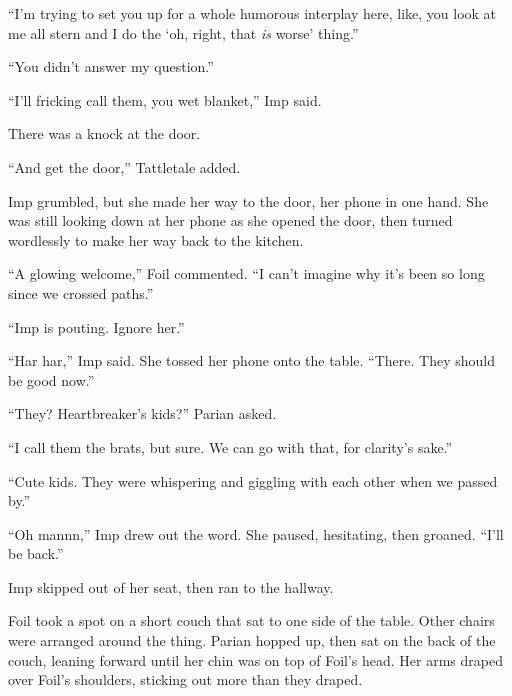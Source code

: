 ``I'm trying to set you up for a whole humorous interplay here, like, you look at me all stern and I do the `oh, right, that \emph{is} worse' thing.''



``You didn't answer my question.''



``I'll fricking call them, you wet blanket,'' Imp said.



There was a knock at the door.



``And get the door,'' Tattletale added.



Imp grumbled, but she made her way to the door, her phone in one hand.  She was still looking down at her phone as she opened the door, then turned wordlessly to make her way back to the kitchen.



``A glowing welcome,'' Foil commented.  ``I can't imagine why it's been so long since we crossed paths.''



``Imp is pouting.  Ignore her.''



``Har har,'' Imp said.  She tossed her phone onto the table.  ``There.  They should be good now.''



``They?  Heartbreaker's kids?''  Parian asked.



``I call them the brats, but sure.  We can go with that, for clarity's sake.''



``Cute kids.  They were whispering and giggling with each other when we passed by.''



``Oh mannn,'' Imp drew out the word.  She paused, hesitating, then groaned.  ``I'll be back.''



Imp skipped out of her seat, then ran to the hallway.



Foil took a spot on a short couch that sat to one side of the table.  Other chairs were arranged around the thing.  Parian hopped up, then sat on the back of the couch, leaning forward until her chin was on top of Foil's head.  Her arms draped over Foil's shoulders, sticking out more than they draped.



